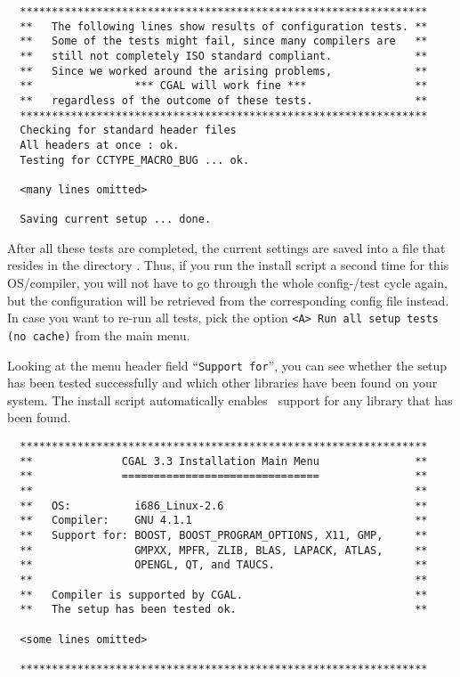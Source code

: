 {\ccTexHtml{\scriptsize}{}
\begin{verbatim}
  ****************************************************************
  **   The following lines show results of configuration tests. **
  **   Some of the tests might fail, since many compilers are   **
  **   still not completely ISO standard compliant.             **
  **   Since we worked around the arising problems,             **
  **                *** CGAL will work fine ***                 **
  **   regardless of the outcome of these tests.                **
  ****************************************************************
  Checking for standard header files
  All headers at once : ok.
  Testing for CCTYPE_MACRO_BUG ... ok.

  <many lines omitted>

  Saving current setup ... done.
\end{verbatim}
}

After all these tests are completed, the current settings are saved
into a file that resides in the directory \cgalinstconfdir.  Thus, if
you run the install script a second time for this OS/compiler, you
will not have to go through the whole config-/test cycle again, but
the configuration will be retrieved from the corresponding config file
instead. In case you want to re-run all tests, pick the option
\texttt{<A> Run all setup tests (no cache)} from the main menu.

Looking at the menu header field ``\texttt{Support for}'', you can see
whether the setup has been tested successfully and which other
libraries have been found on your system. The install script
automatically enables \cgal\ support for any library that has been
found.

{\ccTexHtml{\scriptsize}{}
\begin{verbatim}
  ****************************************************************
  **              CGAL 3.3 Installation Main Menu               **
  **              ===============================               **
  **                                                            **
  **   OS:          i686_Linux-2.6                              **
  **   Compiler:    GNU 4.1.1                                   **
  **   Support for: BOOST, BOOST_PROGRAM_OPTIONS, X11, GMP,     **
  **                GMPXX, MPFR, ZLIB, BLAS, LAPACK, ATLAS,     **
  **                OPENGL, QT, and TAUCS.                      **
  **                                                            **
  **   Compiler is supported by CGAL.                           **
  **   The setup has been tested ok.                            **

  <some lines omitted>

  ****************************************************************
\end{verbatim}
}

